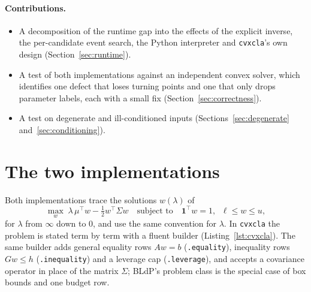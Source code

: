 \documentclass[11pt,a4paper]{article}
\newcommand{\code}[1]{\texttt{#1}}
\newcommand{\cvxcla}{\code{cvxcla}}
\begin{document}
\paragraph{Contributions.}
\begin{itemize}
  \item A decomposition of the runtime gap into the effects of the explicit
    inverse, the per-candidate event search, the Python interpreter and
    \cvxcla{}'s own design (Section~\ref{sec:runtime}).
  \item A test of both implementations against an independent convex solver,
    which identifies one defect that loses turning points and one that only
    drops parameter labels, each with a small fix
    (Section~\ref{sec:correctness}).
  \item A test on degenerate and ill-conditioned inputs
    (Sections~\ref{sec:degenerate} and~\ref{sec:conditioning}).
\end{itemize}

\section{The two implementations}\label{sec:implementations}

Both implementations trace the solutions $w(\lambda)$ of
\begin{equation}\label{eq:qp}
  \max_w \; \lambda\, \mu^\top w - \tfrac12 w^\top \Sigma w
  \quad\text{subject to}\quad \mathbf{1}^\top w = 1,\;\; \ell \le w \le u,
\end{equation}
for $\lambda$ from $\infty$ down to 0, and use the same convention for
$\lambda$. In \cvxcla{} the problem is stated term by term with a fluent
builder (Listing~\ref{lst:cvxcla}). The same builder adds general equality
rows $Aw = b$ (\code{.equality}), inequality rows $Gw \le h$
(\code{.inequality}) and a leverage cap (\code{.leverage}), and accepts a
covariance operator in place of the matrix $\Sigma$; BLdP's problem class is
the special case of box bounds and one budget row.
\end{document}

